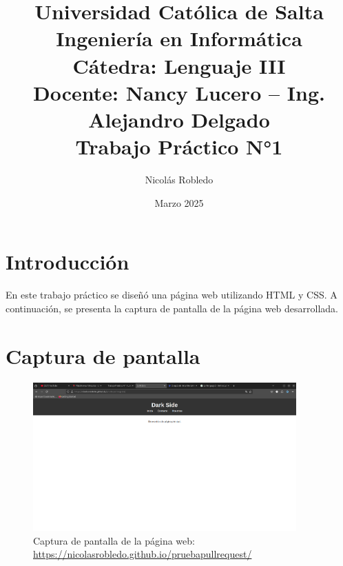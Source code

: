 \documentclass{article}
\title{
    \textbf{Universidad Católica de Salta} \\
    \vspace{0.5cm}
    \textbf{Ingeniería en Informática} \\
    \vspace{0.5cm}
    \textbf{Cátedra: Lenguaje III} \\
    \vspace{0.5cm}
    \textbf{Docente: Nancy Lucero – Ing. Alejandro Delgado} \\
    \vspace{1cm}
    \textbf{Trabajo Práctico N°1}
}
\author{Nicolás Robledo}
\date{Marzo 2025}
\begin{document}
\maketitle

\section{Introducción}

En este trabajo práctico se diseñó una página web utilizando HTML y CSS. A continuación, se presenta la captura de pantalla de la página web desarrollada.

\section{Captura de pantalla}

\begin{figure}[h]
    \centering
    \includegraphics[width=0.9\textwidth]{Pasted image.png} %
    \caption{Captura de pantalla de la página web: \url{https://nicolasrobledo.github.io/pruebapullrequest/}}
    \label{fig:captura}
\end{figure}
\end{document}
